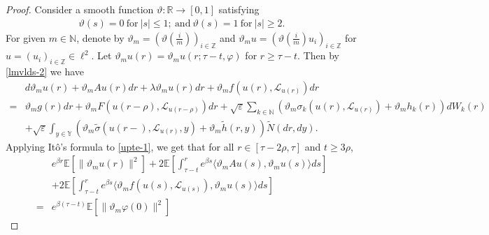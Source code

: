 \documentclass[11pt]{article}
\numberwithin{equation}{section}
\theoremstyle{plain}
\begin{document}
\begin{proof}
 Consider a smooth function $\vartheta: \mathbb{R} \to [0,1]$ satisfying
 \begin{align}\label{smoothf}
    \vartheta(s) = 0\ \text{for}\ |s| \le 1; \ \text{and}\
    \vartheta(s) = 1\ \text{for}\ |s| \ge 2.
 \end{align}
 For given $m \in \mathbb{N}$,
 denote by $\vartheta_m = ( \vartheta(\frac{i}{m}) )_{i \in \mathbb{Z}}$
 and $\vartheta_m u = (\vartheta(\frac{i}{m}) u_i)_{i \in \mathbb{Z}}$
 for $u = (u_i)_{i \in \mathbb{Z}} \in \ell^2$.
 Let $\vartheta_m u(r) = \vartheta_m u(r; \tau - t,\varphi)$ for $r \ge \tau-t$.
 Then by \eqref{lmvlds-2} we have
 \begin{align}\label{upte-1}
       & d \vartheta_m u(r)
          + \vartheta_m Au(r) dr
          + \lambda \vartheta_m u(r) dr
          + \vartheta_m f(u(r),\mathcal{L}_{u(r)}) dr \nonumber \\
   = & \vartheta_m g(r) dr
          + \vartheta_m F( u(r - \rho), \mathcal{L}_{u(r - \rho)} ) dr
          + \sqrt{\varepsilon} 
                 \sum_{k \in \mathbb{N} } 
                     \left( \vartheta_m \sigma_k(u(r), \mathcal{L}_{u(r)}) 
                               + \vartheta_m h_k(r) 
                    \right) dW_k(r)  \nonumber \\
      & + \sqrt{\varepsilon}
                  \int_{y \in \mathbb{Y} }
                   \left( \vartheta_m \widetilde{\sigma}(u(r-), \mathcal{L}_{u(r)}, y) 
                            + \vartheta_m \widetilde{h}(r, y) 
                   \right) \widetilde{N}(dr,dy).
 \end{align}
 Applying It\^o's formula to \eqref{upte-1}, we get that for all $r \in [\tau-2\rho, \tau]$ and $t \ge 3\rho$,
 \begin{align}\label{upte-2}
        & e^{\beta r} \mathbb{E} \left[ \| \vartheta_m  u(r)\|^2 \right]
          + 2 \mathbb{E}
                  \left[ \int_{\tau-t}^{r} e^{\beta s}
                               \langle \vartheta_m A u(s), \vartheta_m u(s) \rangle ds
                  \right]  \nonumber\\
        & + 2 \mathbb{E}
                 \left[ \int_{\tau-t}^{r} e^{\beta s}
                              \langle \vartheta_m f(u(s), \mathcal{L}_{u(s)}),
                                      \vartheta_m u(s)
                              \rangle ds
                 \right]  \nonumber\\
      = & e^{\beta (\tau-t)} \mathbb{E} \left[ \|\vartheta_m \varphi(0)\|^2 \right]

\end{align}
\end{proof}
\end{document}
